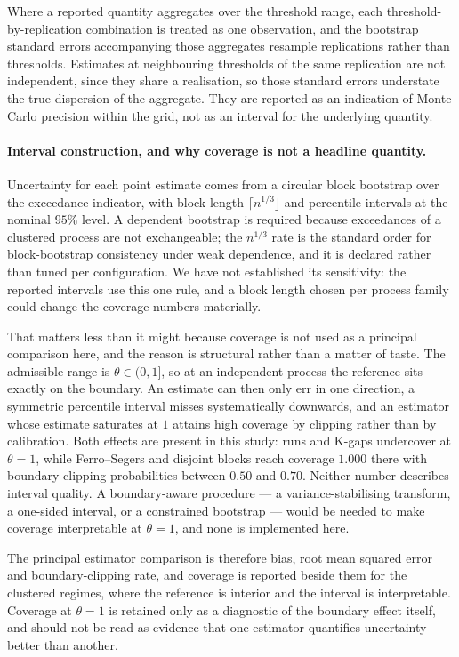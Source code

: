 Where a reported quantity aggregates over the threshold range, each threshold-by-replication combination is treated as one observation, and the bootstrap standard errors accompanying those aggregates resample replications rather than thresholds. Estimates at neighbouring thresholds of the same replication are not independent, since they share a realisation, so those standard errors understate the true dispersion of the aggregate. They are reported as an indication of Monte Carlo precision within the grid, not as an interval for the underlying quantity.

\paragraph{Interval construction, and why coverage is not a headline quantity.} Uncertainty for each point estimate comes from a circular block bootstrap over the exceedance indicator, with block length \(\lceil n^{1/3}\rfloor\) and percentile intervals at the nominal \(95\%\) level. A dependent bootstrap is required because exceedances of a clustered process are not exchangeable; the \(n^{1/3}\) rate is the standard order for block-bootstrap consistency under weak dependence, and it is declared rather than tuned per configuration. We have not established its sensitivity: the reported intervals use this one rule, and a block length chosen per process family could change the coverage numbers materially.

That matters less than it might because coverage is not used as a principal comparison here, and the reason is structural rather than a matter of taste. The admissible range is \(\theta \in (0,1]\), so at an independent process the reference sits exactly on the boundary. An estimate can then only err in one direction, a symmetric percentile interval misses systematically downwards, and an estimator whose estimate saturates at \(1\) attains high coverage by clipping rather than by calibration. Both effects are present in this study: runs and K-gaps undercover at \(\theta = 1\), while Ferro--Segers and disjoint blocks reach coverage \(1.000\) there with boundary-clipping probabilities between \(0.50\) and \(0.70\). Neither number describes interval quality. A boundary-aware procedure --- a variance-stabilising transform, a one-sided interval, or a constrained bootstrap --- would be needed to make coverage interpretable at \(\theta = 1\), and none is implemented here.

The principal estimator comparison is therefore bias, root mean squared error and boundary-clipping rate, and coverage is reported beside them for the clustered regimes, where the reference is interior and the interval is interpretable. Coverage at \(\theta = 1\) is retained only as a diagnostic of the boundary effect itself, and should not be read as evidence that one estimator quantifies uncertainty better than another.

